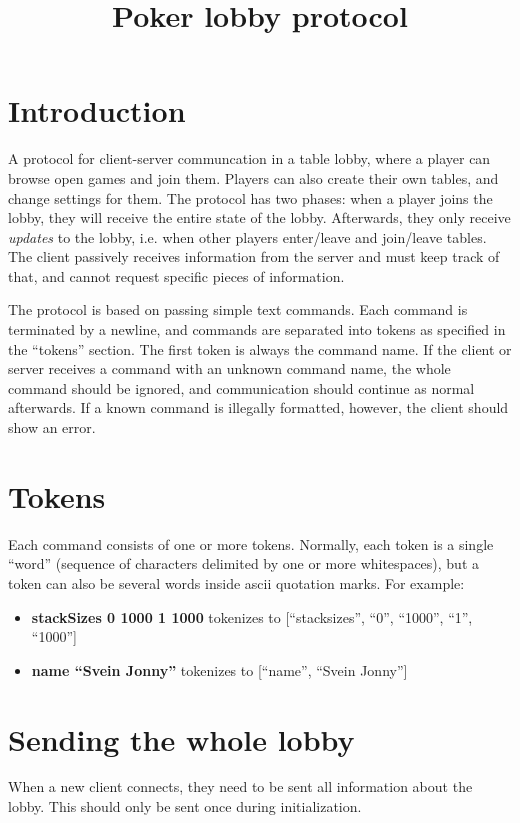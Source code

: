 \documentclass{article}
\title{Poker lobby protocol}
\begin{document}
\maketitle

\section{Introduction}
A protocol for client-server communcation in a table lobby, where a player can browse open games and join them. Players can also create their own tables, and change settings for them. The protocol has two phases: when a player joins the lobby, they will receive the entire state of the lobby. Afterwards, they only receive \textit{updates} to the lobby, i.e. when other players enter/leave and join/leave tables. The client passively receives information from the server and must keep track of that, and cannot request specific pieces of information.

The protocol is based on passing simple text commands. Each command is terminated by a newline, and commands are separated into tokens as specified in the ``tokens'' section. The first token is always the command name. If the client or server receives a command with an unknown command name, the whole command should be ignored, and communication should continue as normal afterwards. If a known command is illegally formatted, however, the client should show an error.

\section{Tokens}
Each command consists of one or more tokens. Normally, each token is a single ``word'' (sequence of characters delimited by one or more whitespaces), but a token can also be several words inside ascii quotation marks. For example:
\begin{itemize}
\item \textbf{stackSizes 0 1000 1 1000} tokenizes to [``stacksizes'', ``0'', ``1000'', ``1'', ``1000'']
\item \textbf{name ``Svein Jonny''} tokenizes to [``name'', ``Svein Jonny'']
\end{itemize}

\section{Sending the whole lobby}
When a new client connects, they need to be sent all information about the lobby. This should only be sent once during initialization.
\end{document}
